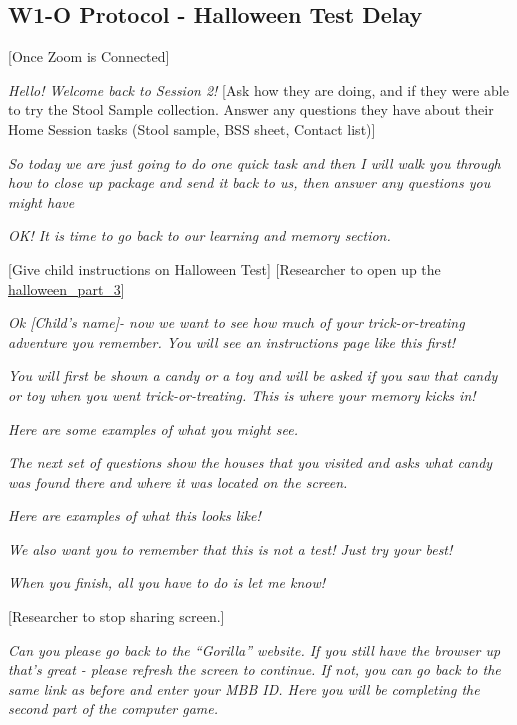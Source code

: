 \documentclass[
]{book}
\begin{document}
\hypertarget{w1-o-protocol---halloween-test-delay}{%
\subsection{W1-O Protocol - Halloween Test Delay}\label{w1-o-protocol---halloween-test-delay}}

{[}Once Zoom is Connected{]}

\emph{Hello! Welcome back to Session 2!} {[}Ask how they are doing, and if they were able to try the Stool Sample collection. Answer any questions they have about their Home Session tasks (Stool sample, BSS sheet, Contact list){]}

\emph{So today we are just going to do one quick task and then I will walk you through how to close up package and send it back to us, then answer any questions you might have}

\emph{OK! It is time to go back to our learning and memory section.}

{[}Give child instructions on Halloween Test{]} {[}Researcher to open up the \href{https://ucla.app.box.com/file/737558206552}{halloween\_part\_3}{]}

\emph{Ok {[}Child's name{]}- now we want to see how much of your trick-or-treating adventure you remember. You will see an instructions page like this first!}

\emph{You will first be shown a candy or a toy and will be asked if you saw that candy or toy when you went trick-or-treating. This is where your memory kicks in!}

\emph{Here are some examples of what you might see.}

\emph{The next set of questions show the houses that you visited and asks what candy was found there and where it was located on the screen.}

\emph{Here are examples of what this looks like!}

\emph{We also want you to remember that this is not a test! Just try your best!}

\emph{When you finish, all you have to do is let me know!}

{[}Researcher to stop sharing screen.{]}

\emph{Can you please go back to the ``Gorilla'' website. If you still have the browser up that's great - please refresh the screen to continue. If not, you can go back to the same link as before and enter your MBB ID. Here you will be completing the second part of the computer game.}
\end{document}
